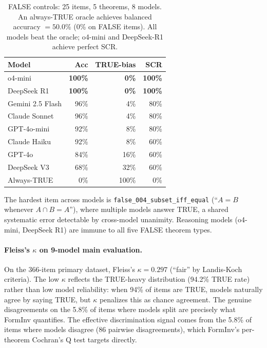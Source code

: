 \documentclass{article}
\begin{document}
\begin{table}[h]\centering\small
\caption{FALSE controls: 25 items, 5 theorems, 8 models.
An always-TRUE oracle achieves balanced accuracy $= 50.0\%$ (0\% on FALSE items).
All models beat the oracle; o4-mini and DeepSeek-R1 achieve perfect SCR.}
\label{tab:false_controls_full}
\begin{tabular}{p{2.6cm}rrr}
\toprule
Model & Acc & TRUE-bias & SCR \\
\midrule
o4-mini & \textbf{100\%} & \textbf{0\%} & \textbf{100\%} \\
DeepSeek R1 & \textbf{100\%} & \textbf{0\%} & \textbf{100\%} \\
Gemini 2.5 Flash & 96\% & 4\% & 80\% \\
Claude Sonnet & 96\% & 4\% & 80\% \\
GPT-4o-mini & 92\% & 8\% & 80\% \\
Claude Haiku & 92\% & 8\% & 60\% \\
GPT-4o & 84\% & 16\% & 60\% \\
DeepSeek V3 & 68\% & 32\% & 60\% \\
\midrule
Always-TRUE & 0\% & 100\% & 0\% \\
\bottomrule
\end{tabular}
\par{}
\end{table}

The hardest item across models is \texttt{false\_004\_subset\_iff\_equal} (``$A{=}B$ whenever $A{\cap}B{=}A$''), where multiple models answer TRUE, a shared systematic error detectable by cross-model unanimity.
Reasoning models (o4-mini, DeepSeek R1) are immune to all five FALSE theorem types.

\paragraph{Fleiss's $\kappa$ on 9-model main evaluation.}
On the 366-item primary dataset, Fleiss's $\kappa = 0.297$ (``fair'' by Landis-Koch criteria).
The low $\kappa$ reflects the TRUE-heavy distribution (94.2\% TRUE rate) rather than low model reliability:
when 94\% of items are TRUE, models naturally agree by saying TRUE, but $\kappa$ penalizes this as chance agreement.
The genuine disagreements on the 5.8\% of items where models split are precisely what FormInv quantifies.
The effective discrimination signal comes from the 5.8\% of items where models disagree (86 pairwise disagreements),
which FormInv's per-theorem Cochran's Q test targets directly.
\end{document}
